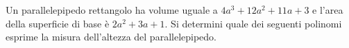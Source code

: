 Un parallelepipedo rettangolo ha volume uguale a
$4a^3 + 12a^2 + 11a + 3$ e l'area della superficie di base è
$2a^2 + 3a + 1$. 
Si determini quale dei seguenti polinomi esprime la misura 
dell'altezza del parallelepipedo.
